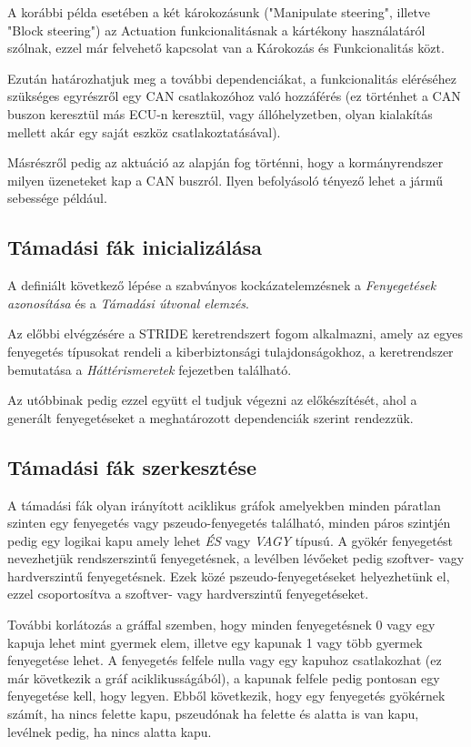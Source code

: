 A korábbi példa esetében a két károkozásunk ("Manipulate steering", illetve "Block steering") az Actuation funkcionalitásnak a kártékony használatáról szólnak, ezzel már felvehető kapcsolat van a Károkozás és Funkcionalitás közt. 

Ezután határozhatjuk meg a további dependenciákat, a funkcionalitás eléréséhez szükséges egyrészről egy CAN csatlakozóhoz való hozzáférés (ez történhet a CAN buszon keresztül más ECU-n keresztül, vagy állóhelyzetben, olyan kialakítás mellett akár egy saját eszköz csatlakoztatásával). 

Másrészről pedig az aktuáció az alapján fog történni, hogy a kormányrendszer milyen üzeneteket kap a CAN buszról. Ilyen befolyásoló tényező lehet a jármű sebessége például.

\subsection{Támadási fák inicializálása}

A definiált következő lépése a szabványos kockázatelemzésnek a \textit{Fenyegetések azonosítása} és a \textit{Támadási útvonal elemzés}. 

Az előbbi elvégzésére a STRIDE keretrendszert fogom alkalmazni, amely az egyes fenyegetés típusokat rendeli a kiberbiztonsági tulajdonságokhoz, a keretrendszer bemutatása a \textit{Háttérismeretek} fejezetben található.

Az utóbbinak pedig ezzel együtt el tudjuk végezni az előkészítését, ahol a generált fenyegetéseket a meghatározott dependenciák szerint rendezzük.

\subsection{Támadási fák szerkesztése}

A támadási fák olyan irányított aciklikus gráfok amelyekben minden páratlan szinten egy fenyegetés vagy pszeudo-fenyegetés található, minden páros szintjén pedig egy logikai kapu amely lehet \textit{ÉS} vagy \textit{VAGY} típusú. A gyökér fenyegetést nevezhetjük rendszerszintű fenyegetésnek, a levélben lévőeket pedig szoftver- vagy hardverszintű fenyegetésnek. Ezek közé pszeudo-fenyegetéseket helyezhetünk el, ezzel csoportosítva a szoftver- vagy hardverszintű fenyegetéseket. 

További korlátozás a gráffal szemben, hogy minden fenyegetésnek 0 vagy egy kapuja lehet mint gyermek elem, illetve egy kapunak 1 vagy több gyermek fenyegetése lehet. A fenyegetés felfele nulla vagy egy kapuhoz csatlakozhat (ez már következik a gráf aciklikusságából), a kapunak felfele pedig pontosan egy fenyegetése kell, hogy legyen. Ebből következik, hogy egy fenyegetés gyökérnek számít, ha nincs felette kapu, pszeudónak ha felette és alatta is van kapu, levélnek pedig, ha nincs alatta kapu.

